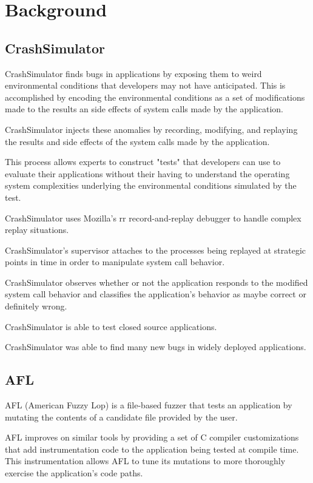 \section{Background}
\label{SEC:background}

\subsection{CrashSimulator}

CrashSimulator finds bugs in applications by exposing them to weird
environmental conditions that developers may not have anticipated.  This is
accomplished by encoding the environmental conditions as a set of
modifications made to the results an side effects of system calls made by
the application.

CrashSimulator injects these anomalies by recording, modifying, and
replaying the results and side effects of the system calls made by the
application.

This process allows experts to construct "tests" that developers can use to
evaluate their applications without their having to understand the
operating system complexities underlying the environmental conditions
simulated by the test.

CrashSimulator uses Mozilla's rr record-and-replay debugger to handle
complex replay situations.

CrashSimulator's supervisor attaches to the processes being replayed at
strategic points in time in order to manipulate system call behavior.

CrashSimulator observes whether or not the application responds to the
modified system call behavior and classifies the application's behavior as
maybe correct or definitely wrong.

CrashSimulator is able to test closed source applications.

CrashSimulator was able to find many new bugs in widely deployed
applications.


\subsection{AFL}

AFL (American Fuzzy Lop) is a file-based fuzzer that tests an application
by mutating the contents of a candidate file provided by the user.

AFL improves on similar tools by providing a set of C compiler
customizations that add instrumentation code to the application being
tested at compile time.  This instrumentation allows AFL to tune its
mutations to more thoroughly exercise the application's code paths.

